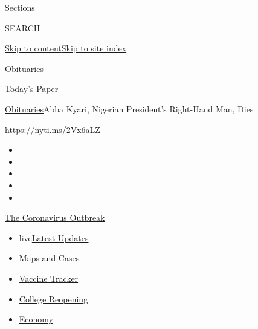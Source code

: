 Sections

SEARCH

\protect\hyperlink{site-content}{Skip to
content}\protect\hyperlink{site-index}{Skip to site index}

\href{https://www.nytimes3xbfgragh.onion/section/obituaries}{Obituaries}

\href{https://myaccount.nytimes3xbfgragh.onion/auth/login?response_type=cookie\&client_id=vi}{}

\href{https://www.nytimes3xbfgragh.onion/section/todayspaper}{Today's
Paper}

\href{/section/obituaries}{Obituaries}\textbar{}Abba Kyari, Nigerian
President's Right-Hand Man, Dies

\url{https://nyti.ms/2Vx6aLZ}

\begin{itemize}
\item
\item
\item
\item
\item
\end{itemize}

\href{https://www.nytimes3xbfgragh.onion/news-event/coronavirus?action=click\&pgtype=Article\&state=default\&region=TOP_BANNER\&context=storylines_menu}{The
Coronavirus Outbreak}

\begin{itemize}
\tightlist
\item
  live\href{https://www.nytimes3xbfgragh.onion/2020/08/04/world/coronavirus-covid-19.html?action=click\&pgtype=Article\&state=default\&region=TOP_BANNER\&context=storylines_menu}{Latest
  Updates}
\item
  \href{https://www.nytimes3xbfgragh.onion/interactive/2020/us/coronavirus-us-cases.html?action=click\&pgtype=Article\&state=default\&region=TOP_BANNER\&context=storylines_menu}{Maps
  and Cases}
\item
  \href{https://www.nytimes3xbfgragh.onion/interactive/2020/science/coronavirus-vaccine-tracker.html?action=click\&pgtype=Article\&state=default\&region=TOP_BANNER\&context=storylines_menu}{Vaccine
  Tracker}
\item
  \href{https://www.nytimes3xbfgragh.onion/2020/08/02/us/covid-college-reopening.html?action=click\&pgtype=Article\&state=default\&region=TOP_BANNER\&context=storylines_menu}{College
  Reopening}
\item
  \href{https://www.nytimes3xbfgragh.onion/live/2020/08/03/business/stock-market-today-coronavirus?action=click\&pgtype=Article\&state=default\&region=TOP_BANNER\&context=storylines_menu}{Economy}
\end{itemize}

